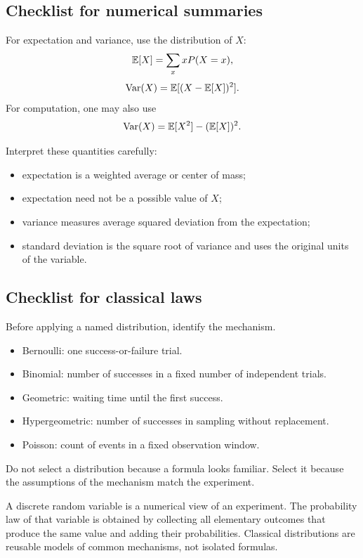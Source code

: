 \subsection*{Checklist for numerical summaries}

For expectation and variance, use the distribution of \(X\):
\[
\mathbb{E}[X]=\sum_x xP(X=x),
\]
\[
\operatorname{Var}(X)=\mathbb{E}[(X-\mathbb{E}[X])^2].
\]
For computation, one may also use
\[
\operatorname{Var}(X)=\mathbb{E}[X^2]-(\mathbb{E}[X])^2.
\]

Interpret these quantities carefully:
\begin{itemize}
    \item expectation is a weighted average or center of mass;
    \item expectation need not be a possible value of \(X\);
    \item variance measures average squared deviation from the expectation;
    \item standard deviation is the square root of variance and uses the original
    units of the variable.
\end{itemize}

\subsection*{Checklist for classical laws}

Before applying a named distribution, identify the mechanism.

\begin{itemize}
    \item Bernoulli: one success-or-failure trial.
    \item Binomial: number of successes in a fixed number of independent trials.
    \item Geometric: waiting time until the first success.
    \item Hypergeometric: number of successes in sampling without replacement.
    \item Poisson: count of events in a fixed observation window.
\end{itemize}

Do not select a distribution because a formula looks familiar. Select it because
the assumptions of the mechanism match the experiment.

\begin{summarybox}
A discrete random variable is a numerical view of an experiment. The probability
law of that variable is obtained by collecting all elementary outcomes that
produce the same value and adding their probabilities. Classical distributions
are reusable models of common mechanisms, not isolated formulas.
\end{summarybox}
